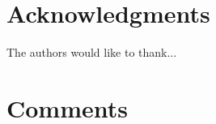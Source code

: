 \documentclass[conference,compsoc]{IEEEtran}
\begin{document}
\section*{Acknowledgments}

The authors would like to thank...



\section*{Comments}




%
%
%
%



%
%


\end{document}
